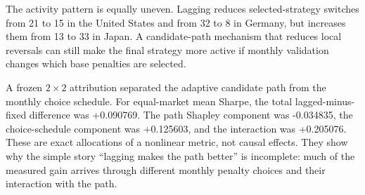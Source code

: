 \documentclass[11pt]{article}
\begin{document}
The activity pattern is equally uneven. Lagging reduces selected-strategy switches from 21 to 15 in the United States and from 32 to 8 in Germany, but increases them from 13 to 33 in Japan. A candidate-path mechanism that reduces local reversals can still make the final strategy more active if monthly validation changes which base penalties are selected.

\begin{table}[H]
\centering
\caption{Primary-delay performance and activity at $\beta=\log 4$. MDD and turnover are percentages.}
\label{tab:adaptiveperf}
\small
{}
\end{table}

A frozen $2\times2$ attribution separated the adaptive candidate path from the monthly choice schedule. For equal-market mean Sharpe, the total lagged-minus-fixed difference was +0.090769. The path Shapley component was -0.034835, the choice-schedule component was +0.125603, and the interaction was +0.205076. These are exact allocations of a nonlinear metric, not causal effects. They show why the simple story ``lagging makes the path better'' is incomplete: much of the measured gain arrives through different monthly penalty choices and their interaction with the path.
\end{document}
